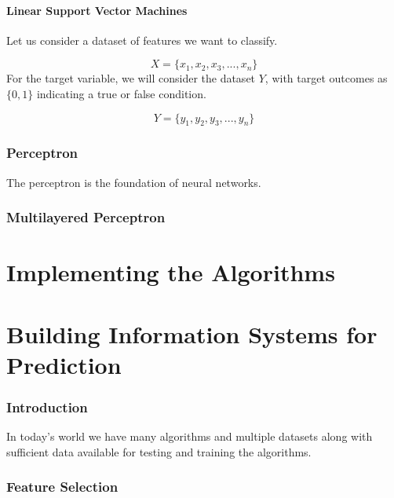 \documentclass[12pt]{article}
\begin{document}
\subsection{Linear Support Vector Machines}
Let us consider a dataset of features we want to classify.

$$
X = \lbrace x_{1}, x_{2}, x_{3}, ... , x_{n} \rbrace 
$$
For the target variable, we will consider the dataset $Y$, with target outcomes as $\lbrace0,1\rbrace$ indicating a true or false condition.

$$
Y = \lbrace y_{1}, y_{2}, y_{3}, ... , y_{n} \rbrace 
$$

\newpage
\section{Perceptron}
The perceptron is the foundation of neural networks.

\newpage
\section{Multilayered Perceptron}

\newpage
\part{Implementing the Algorithms}

\newpage
\part{Building Information Systems for Prediction}
\section{Introduction}
In today's world we have many algorithms and multiple datasets along with sufficient data available for testing and training the algorithms.



\section{Feature Selection}
\newpage
\end{document}
